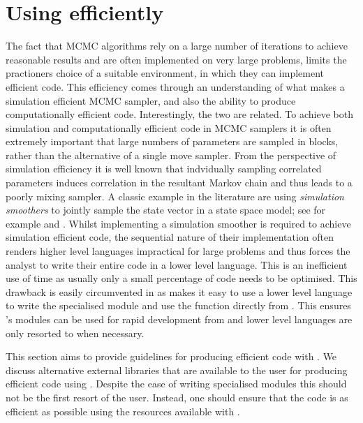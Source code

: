 \documentclass[article]{jss}
\begin{document}
\section[Using PyMCMC  efficiently]{Using   efficiently}
\label{sec:Using-PyMCMC-efficiently}

The fact that MCMC algorithms rely on a large number of iterations to
achieve reasonable results and are often implemented on very large
problems, limits the practioners choice of a suitable environment, in
which they can implement efficient code. This efficiency comes through
an understanding of what makes a simulation efficient MCMC sampler,
and also the ability to produce computationally efficient code.
Interestingly, the two are related. To achieve both simulation and
computationally efficient code in MCMC samplers it is often extremely
important that large numbers of parameters are sampled in blocks,
rather than the alternative of a single move sampler. From the
perspective of simulation efficiency it is well known that indvidually
sampling correlated parameters induces correlation in the resultant
Markov chain and thus leads to a poorly mixing sampler. A classic
example in the literature are using \emph{simulation smoothers }to
jointly sample the state vector in a state space model; see for
example \citet{CarterKohn1994} and \citet{deJongShepard1995}.  Whilst
implementing a simulation smoother is required to achieve simulation
efficient code, the sequential nature of their implementation often
renders higher level languages impractical for large problems and thus
forces the analyst to write their entire code in a lower level
language. This is an inefficient use of time as usually only a small
percentage of code needs to be optimised. This drawback is easily
circumvented in  as  makes it easy to use
a lower level language to write the specialised module and use the
function directly from . This ensures 's
modules can be used for rapid development from  and
lower level languages are only resorted to when necessary.

This section aims to provide guidelines for producing efficient code
with . We discuss alternative external libraries that are
available to the user for producing efficient code using .
Despite the ease of writing specialised modules this should not be the
first resort of the user. Instead, one should ensure that the
 code is as efficient as possible using the resources
available with .
\end{document}
